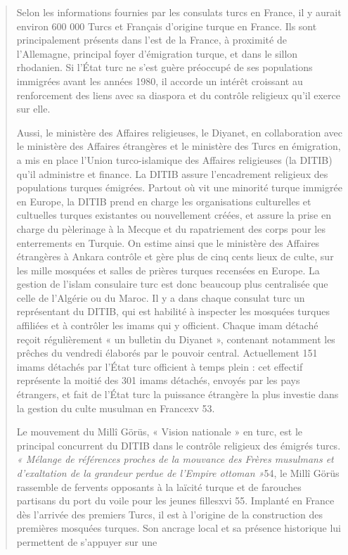 \begin{quote}
Selon les informations fournies par les consulats turcs en France, il y
aurait environ 600 000 Turcs et Français d'origine turque en France. Ils
sont principalement présents dans l'est de la France, à proximité de
l'Allemagne, principal foyer d'émigration turque, et dans le sillon
rhodanien. Si l'État turc ne s'est guère préoccupé de ses populations
immigrées avant les années 1980, il accorde un intérêt croissant au
renforcement des liens avec sa diaspora et du contrôle religieux qu'il
exerce sur elle.

Aussi, le ministère des Affaires religieuses, le Diyanet, en
collaboration avec le ministère des Affaires étrangères et le ministère
des Turcs en émigration, a mis en place l'Union turco-islamique des
Affaires religieuses (la DITIB) qu'il administre et finance. La DITIB
assure l'encadrement religieux des populations turques émigrées. Partout
où vit une minorité turque immigrée en Europe, la DITIB prend en charge
les organisations culturelles et cultuelles turques existantes ou
nouvellement créées, et assure la prise en charge du pèlerinage à la
Mecque et du rapatriement des corps pour les enterrements en Turquie. On
estime ainsi que le ministère des Affaires étrangères à Ankara contrôle
et gère plus de cinq cents lieux de culte, sur les mille mosquées et
salles de prières turques recensées en Europe. La gestion de l'islam
consulaire turc est donc beaucoup plus centralisée que celle de
l'Algérie ou du Maroc. Il y a dans chaque consulat turc un représentant
du DITIB, qui est habilité à inspecter les mosquées turques affiliées et
à contrôler les imams qui y officient. Chaque imam détaché reçoit
régulièrement « un bulletin du Diyanet », contenant notamment les
prêches du vendredi élaborés par le pouvoir central. Actuellement 151
imams détachés par l'État turc officient à temps plein : cet effectif
représente la moitié des 301 imams détachés, envoyés par les pays
étrangers, et fait de l'État turc la puissance étrangère la plus
investie dans la gestion du culte musulman en Francexv 53.

Le mouvement du Millî Görüs, « Vision nationale » en turc, est le
principal concurrent du DITIB dans le contrôle religieux des émigrés
turcs. \emph{« Mélange de références proches de la mouvance des Frères
musulmans et d'exaltation de la grandeur perdue de l'Empire ottoman
»}54, le Millî Görüs rassemble de fervents opposants à la laïcité turque
et de farouches partisans du port du voile pour les jeunes fillesxvi 55.
Implanté en France dès l'arrivée des premiers Turcs, il est à l'origine
de la construction des premières mosquées turques. Son ancrage local et
sa présence historique lui permettent de s'appuyer sur une


\end{quote}
